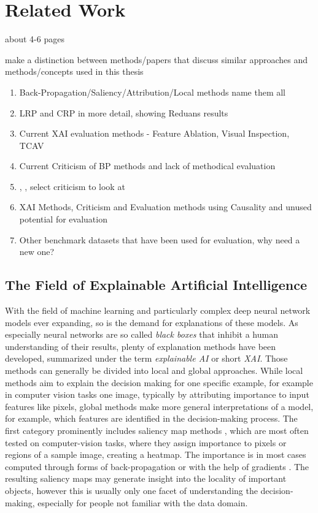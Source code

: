 
\chapter{Related Work}\label{chapter:related_work}


{\color{red}
      about 4-6 pages

      make a distinction between methods/papers that discuss similar approaches and methods/concepts used in this thesis}

\begin{enumerate}
      \item Back-Propagation/Saliency/Attribution/Local methods name them all
      \item LRP and CRP in more detail, showing Reduans results
      \item Current XAI evaluation methods - Feature Ablation, Visual Inspection, TCAV
      \item Current Criticism of BP methods and lack of methodical evaluation
      \item \cite{Sixt2020}, \cite{Wilming2023}, \cite{Kindermans2019} select criticism to look at
      \item XAI Methods, Criticism and Evaluation methods using Causality  and unused potential for evaluation
      \item Other benchmark datasets that have been used for evaluation, why need a new one?
\end{enumerate}


\section{The Field of Explainable Artificial Intelligence}
With the field of machine learning and particularly complex deep neural network models ever expanding, so is the demand for explanations of these models.
As especially neural networks are so called \textit{black boxes} that inhibit a human understanding of their results, plenty of explanation methods have been developed, summarized under the term \textit{explainable AI} or short \textit{XAI}. 
Those methods can generally be divided into local and global approaches. While local methods aim to explain the decision making for one specific example, for example in computer vision tasks one image, typically by attributing importance to input features like pixels, global methods make more general interpretations of a model, for example, which features are identified in the decision-making process. The first category prominently includes saliency map methods , which are most often tested on computer-vision tasks, where they assign importance to pixels or regions of a sample image, creating a heatmap. The importance is in most cases computed through forms of back-propagation  or with the help of gradients . The resulting saliency maps may generate insight into the locality of important objects, however this is usually only one facet of understanding the decision-making, especially for people not familiar with the data domain.

